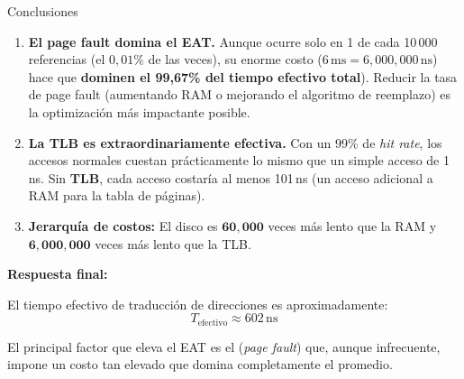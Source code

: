 \documentclass[12pt,letterpaper]{article}
\begin{document}
\begin{conceptbox}{Conclusiones}
\begin{enumerate}[label=\arabic*.]
\item \textbf{El page fault domina el EAT.} Aunque ocurre solo en 1 de cada 10\,000 referencias (el $0{,}01\%$ de las veces), su enorme costo ($6\,\text{ms} = 6{,}000{,}000\,\text{ns}$) hace que \textbf{dominen el 99,67\% del tiempo efectivo total}). Reducir la tasa de page fault (aumentando RAM o mejorando el algoritmo de reemplazo) es la optimización más impactante posible.
  
\item \textbf{La TLB es extraordinariamente efectiva.} Con un 99\% de \textit{hit rate}, los accesos normales cuestan prácticamente lo mismo que un simple acceso de 1\,ns. Sin \textbf{TLB}, cada acceso costaría al menos 101\,ns (un acceso adicional a RAM para la tabla de páginas).
  
\item \textbf{Jerarquía de costos:} El disco es $\mathbf{60{,}000}$ veces más lento que la RAM y $\mathbf{6{,}000{,}000}$ veces más lento que la TLB.
\end{enumerate}
\end{conceptbox}

\begin{resultbox}
  \textbf{Respuesta final:}
  \medskip

  El tiempo efectivo de traducción de direcciones es aproximadamente:
  \[
  \boxed{T_{\text{efectivo}} \approx 602\,\text{ns}}
  \]
  
  El principal factor que eleva el EAT es el (\emph{page fault}) que, aunque infrecuente, impone un costo tan elevado que domina completamente el promedio.
\end{resultbox}
\end{document}
